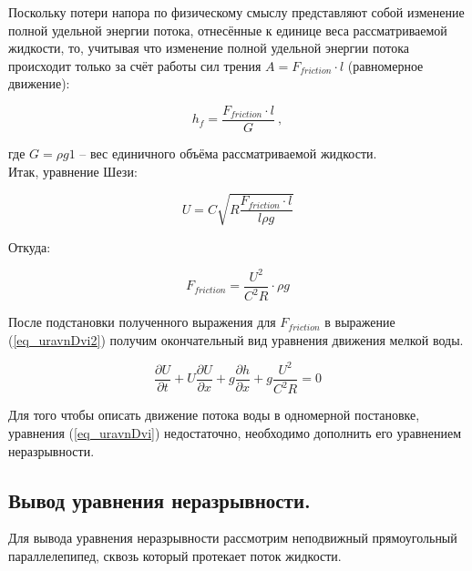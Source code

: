 Поскольку потери напора по физическому смыслу представляют собой изменение полной удельной энергии потока, отнесённые к единице веса рассматриваемой жидкости, то, учитывая что изменение полной удельной энергии потока происходит только за счёт работы сил трения $ A = F_{friction} \cdot l $ (равномерное движение):

$$
  \displaystyle h_f = \frac{F_{friction} \cdot l}{G} \ ,
$$

\noindent где $ G = \rho g 1 $ -- вес единичного объёма рассматриваемой жидкости. \\

Итак, уравнение Шези:

$$
  \displaystyle U = C \sqrt{R \frac{F_{friction} \cdot l}{l \rho g} }
$$

Откуда:

\begin{equation}
  \label{eq_Ffric}
  \displaystyle F_{friction} = \frac{U^2}{C^2 R} \cdot \rho g
\end{equation}

После подстановки полученного выражения для $ F_{friction} $ в выражение (\ref{eq_uravnDvi2}) получим окончательный вид уравнения движения мелкой воды.

\begin{equation}
  \label{eq_uravnDvi}
\displaystyle \frac{\partial U}{\partial t} + U \frac{\partial U}{\partial x} + g \frac{ \partial h}{ \partial x} + g \frac{U^2}{C^2 R} = 0
\end{equation}

\vspace{0.5cm}

Для того чтобы описать движение потока воды в одномерной постановке, уравнения (\ref{eq_uravnDvi}) недостаточно, необходимо дополнить его уравнением неразрывности.

\newpage


\subsection {Вывод уравнения неразрывности.}

Для вывода уравнения неразрывности рассмотрим неподвижный прямоугольный параллелепипед, сквозь который протекает поток жидкости.

